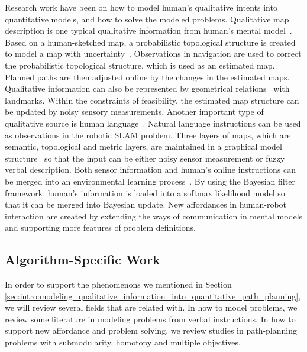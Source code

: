 \documentclass[phd]{byuprop}
\begin{document}
Research work have been on how to model human's qualitative intents into quantitative models, and how to solve the modeled problems.
Qualitative map description is one typical qualitative information from human's mental model~\cite{kuipers1999}.
Based on a human-sketched map, a probabilistic topological structure is created to model a map with uncertainty~\cite{Shah2013}.
Observations in navigation are used to correct the probabilistic topological structure, which is used as an estimated map.
Planned paths are then adjusted online by the changes in the estimated maps.
Qualitative information can also be represented by geometrical relations~\cite{mcclelland2012qualitative,mcclelland2014qualitative} with landmarks.
Within the constraints of feasibility, the estimated map structure can be updated by noisy sensory measurements.
Another important type of qualitative source is human language~\cite{tellex2011understanding,walter2014framework}.
Natural language instructions can be used as observations in the robotic SLAM problem.
Three layers of maps, which are semantic, topological and metric layers, are maintained in a graphical model structure~\cite{walter2014framework} so that the input can be either noisy sensor measurement or fuzzy verbal description.
Both sensor information and human's online instructions can be merged into an environmental learning process~\cite{6301744,5509521,ahmed2014enabling}.
By using the Bayesian filter framework, human's information is loaded into a softmax likelihood model so that it can be merged into Bayesian update.
New affordances in human-robot interaction are created by extending the ways of communication in mental models and supporting more features of problem definitions.

\subsection{Algorithm-Specific Work} 
\label{sec:related_work:algorithm_specific_work}

In order to support the phenomenons we mentioned in Section \ref{sec:intro:modeling_qualitative_information_into_quantitative_path_planning}, we will  review several fields that are related with.
In how to model problems, we review some literature in modeling problems from verbal instructions.
In how to support new affordance and problem solving, we review studies in path-planning problems with submodularity, homotopy and multiple objectives.
\end{document}
